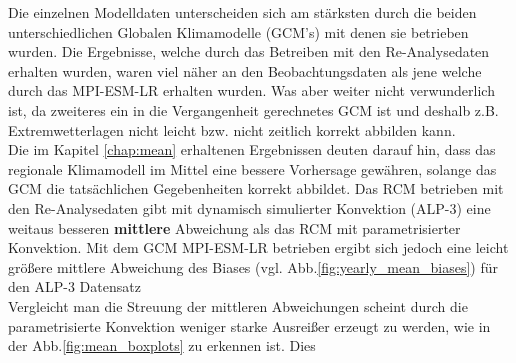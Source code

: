 Die einzelnen Modelldaten unterscheiden sich am stärksten durch die beiden unterschiedlichen Globalen Klimamodelle (GCM's) mit denen sie betrieben wurden. Die Ergebnisse, welche durch das Betreiben mit den Re-Analysedaten erhalten wurden, waren viel näher an den Beobachtungsdaten als jene welche durch das MPI-ESM-LR erhalten wurden. Was aber weiter nicht verwunderlich ist, da zweiteres ein in die Vergangenheit gerechnetes GCM ist und deshalb z.B. Extremwetterlagen nicht leicht bzw. nicht zeitlich korrekt abbilden kann.\\
Die im Kapitel \ref{chap:mean} erhaltenen Ergebnissen deuten darauf hin, dass das regionale Klimamodell im Mittel eine bessere Vorhersage gewähren, solange das GCM die tatsächlichen Gegebenheiten korrekt abbildet. Das RCM betrieben mit den Re-Analysedaten gibt mit dynamisch simulierter Konvektion (ALP-3) eine weitaus besseren \textbf{mittlere} Abweichung als das RCM mit parametrisierter Konvektion. Mit dem GCM MPI-ESM-LR betrieben ergibt sich jedoch eine leicht größere mittlere Abweichung des Biases (vgl. Abb.\ref{fig:yearly_mean_biases}) für den ALP-3 Datensatz\\
Vergleicht man die Streuung der mittleren Abweichungen scheint durch die parametrisierte Konvektion weniger starke Ausreißer erzeugt zu werden, wie in der Abb.\ref{fig:mean_boxplots} zu erkennen ist. Dies 